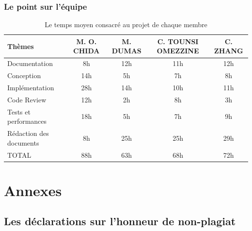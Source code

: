\documentclass[12pt]{article}
\begin{document}
        \subsubsection*{Le point sur l'équipe}
        \begin{table}[!h]
            \begin{center}
                \begin{tabular}{|l|c|c|c|c|}
                    \hline
                    Thèmes & M. O. CHIDA & M. DUMAS & C. TOUNSI OMEZZINE & C. ZHANG \\
                    \hline
                    Documentation & 8h & 12h & 11h & 12h \\
                    Conception & 14h & 5h & 7h & 8h \\
                    Implémentation & 28h & 14h & 10h & 11h \\
                    Code Review & 12h & 2h & 8h & 3h \\
                    Tests et performances & 18h & 5h & 7h & 9h \\
                    Rédaction des documents & 8h & 25h & 25h & 29h \\
                    \hline
                    TOTAL & 88h & 63h & 68h & 72h \\
                    \hline
                \end{tabular}
            \end{center}
            \caption{Le temps moyen consacré au projet de chaque membre}
            \label{tab:times}
        \end{table}

\newpage

\section*{Annexes}
    
    
    \subsection*{Les déclarations sur l'honneur de non-plagiat}
    
    \newpage
    
    \newpage
    
    \newpage
     
    \newpage
    
\end{document}
